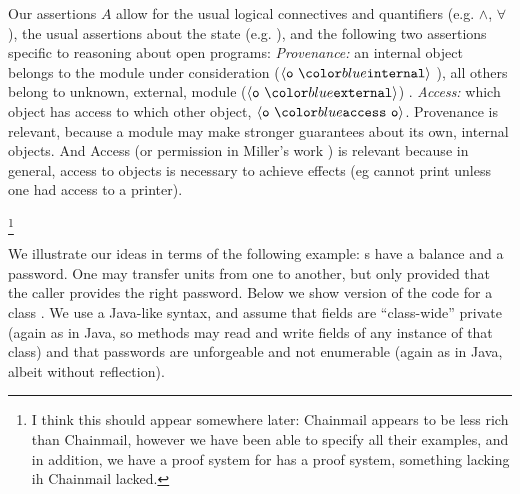 Our assertions $A$ allow for the usual logical connectives and quantifiers
 (e.g. $\wedge$, $\forall$), the usual assertions about the state (e.g. ), and 
 the following two assertions specific to reasoning about open programs:
 \emph{Provenance:}
 an internal object belongs to the module under consideration ($\internal{\texttt{o}}$ ), all others
 belong to   unknown, external, module ($\external{\texttt{o}}$) .  \emph{Access:} 
 which object has access to which other object, $\access{\texttt{o}}{\texttt{o}}$. 
 Provenance is relevant, because a
 module may make stronger guarantees about its own, internal objects. 
 And Access (or permission in Miller's work ) is relevant because in general,
 access to objects is necessary to
 achieve effects (eg cannot print unless one had access to a printer).
  
 
\footnote{I think this should appear somewhere later: Chainmail appears 
 to be less rich than Chainmail, however we have been able to specify 
 all their examples, and in addition, we have a proof system for 
 \Chainmail has a proof system, something lacking 
 ih Chainmail lacked. }
 




We illustrate our ideas in terms of the following example:
s have a balance and a password. One may transfer
 units from one  to another, but only provided
that the caller provides the right password. Below we show version
 of the code for a class .  We use a Java-like
syntax, and assume that fields are ``class-wide'' private (again as in
Java, so methods may read and write fields of any instance of that
class) and that passwords are unforgeable and not enumerable (again as
in Java, albeit without reflection).

